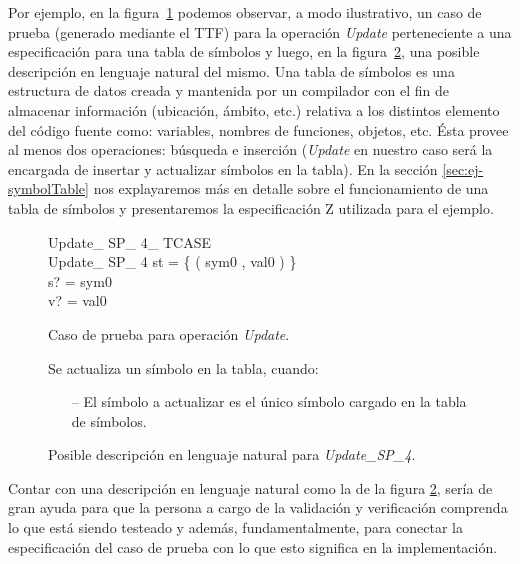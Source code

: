 Por ejemplo, en la figura~\ref{fig:intro_tcl} podemos observar, a modo ilustrativo, un caso de prueba (generado mediante el TTF) para la operación \emph{Update} perteneciente a una especificación para una tabla de símbolos y luego, en la figura~\ref{fig:intro_tcl1}, una posible descripción en lenguaje natural del mismo. Una tabla de símbolos es una estructura de datos creada y mantenida por un compilador con el fin de almacenar información (ubicación, ámbito, etc.) relativa a los distintos elemento del código fuente como: variables, nombres de funciones, objetos, etc. Ésta provee al menos dos operaciones: búsqueda e inserción (\textit{Update} en nuestro caso será la encargada de insertar y actualizar símbolos en la tabla). En la sección \ref{sec:ej-symbolTable} nos explayaremos más en detalle sobre el funcionamiento de una tabla de símbolos y presentaremos la especificación Z utilizada para el ejemplo.

\begin{figure}[H]
	\centering
  \begin{schema}{Update\_ SP\_ 4\_ TCASE}\\
   Update\_ SP\_ 4 
  \where
   st = \{ ( sym0 , val0 ) \} \\
   s? = sym0 \\
   v? = val0
 \end{schema}
 \caption{Caso de prueba para operación \emph{Update}.}
  \label{fig:intro_tcl}
\end{figure}
 
\begin{figure}[H]
 \begin{tcolorbox}[colback=gray!5!white,colframe=gray!50!black,
  colbacktitle=gray!75!black,title=Update\_SP\_4]
  Se actualiza un símbolo en la tabla, cuando:
     \begin{itemize}
  	    \item[--]{El símbolo a actualizar es el único símbolo cargado en la tabla de símbolos.}
     \end{itemize}
 \end{tcolorbox}
 \caption{Posible descripción en lenguaje natural para \emph{Update\_SP\_4}.}
 \label{fig:intro_tcl1}
\end{figure}

Contar con una descripción en lenguaje natural como la de la figura \ref{fig:intro_tcl1}, sería de gran ayuda para que la persona a cargo de la validación y verificación comprenda lo que está siendo testeado y además, fundamentalmente, para conectar la especificación del caso de prueba con lo que esto significa en la implementación.


